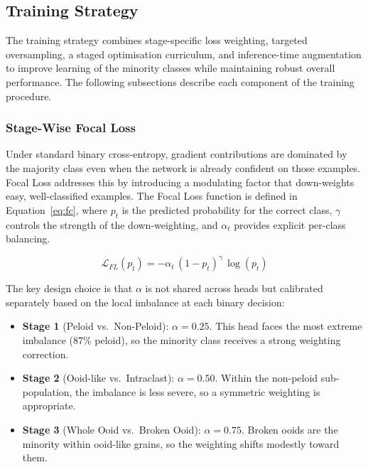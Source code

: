 \documentclass[a4paper,fleqn]{cas-dc}
\begin{document}

\subsection{Training Strategy}
The training strategy combines stage-specific loss weighting, targeted oversampling, a staged optimisation curriculum, and inference-time augmentation to improve learning of the minority classes while maintaining robust overall performance. The following subsections describe each component of the training procedure.
\subsubsection{Stage-Wise Focal Loss}

Under standard binary cross-entropy, gradient contributions are dominated by the majority class even when the
network is already confident on those examples. Focal Loss \citep{lin2017focal} addresses this by introducing a
modulating factor that down-weights easy, well-classified examples. The Focal Loss function is defined in
Equation~\ref{eq:fc}, where $p_t$ is the predicted probability for the correct class, $\gamma$ controls the
strength of the down-weighting, and $\alpha_t$ provides explicit per-class balancing.

\begin{equation}
\mathcal{L}_{FL}(p_t) = -\alpha_t\,(1 - p_t)^{\gamma}\,\log(p_t)
\label{eq:fc}
\end{equation}

The key design choice is that $\alpha$ is not shared across heads but calibrated separately based on the local imbalance at each binary decision:
\begin{itemize}
  \item \textbf{Stage 1} (Peloid vs.\ Non-Peloid): $\alpha = 0.25$. This head faces the most extreme imbalance (87\% peloid), so the minority class receives a strong weighting correction.
  \item \textbf{Stage 2} (Ooid-like vs.\ Intraclast): $\alpha = 0.50$. Within the non-peloid sub-population, the imbalance is less severe, so a symmetric weighting is appropriate.
  \item \textbf{Stage 3} (Whole Ooid vs.\ Broken Ooid): $\alpha = 0.75$. Broken ooids are the minority within ooid-like grains, so the weighting shifts modestly toward them.
\end{itemize}
\end{document}
